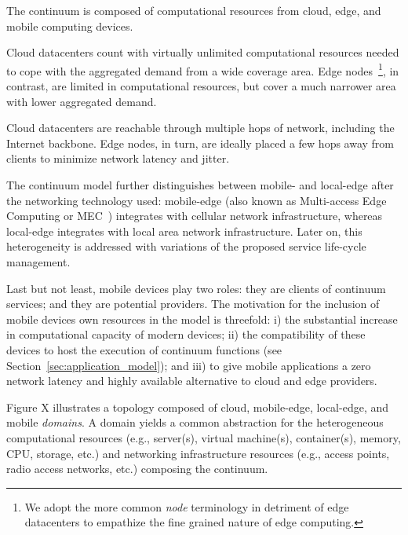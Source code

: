 The continuum is composed of computational resources from cloud, edge, and mobile computing devices. 

Cloud datacenters count with virtually unlimited computational resources needed to cope with the aggregated demand from a wide coverage area. Edge nodes~\footnote{We adopt the more common \textit{node} terminology in detriment of edge datacenters to empathize the fine grained nature of edge computing.}, in contrast, are limited in computational resources, but cover a much narrower area with lower aggregated demand. 

Cloud datacenters are reachable through multiple hops of network, including the Internet backbone. Edge nodes, in turn, are ideally placed a few hops away from clients to minimize network latency and jitter. 

The continuum model further distinguishes between mobile- and local-edge after the networking technology used: mobile-edge (also known as Multi-access Edge Computing or MEC~\cite{}) integrates with cellular network infrastructure, whereas local-edge integrates with local area network infrastructure. Later on, this heterogeneity is addressed with variations of the proposed service life-cycle management.

Last but not least, mobile devices play two roles: they are clients of continuum services; and they are potential providers. The motivation for the inclusion of mobile devices own resources in the model is threefold: i) the substantial increase in computational capacity of modern devices; ii) the compatibility of these devices to host the execution of continuum functions (see Section~\ref{sec:application_model}); and iii) to give mobile applications a zero network latency and highly available alternative to cloud and edge providers. 

Figure X illustrates a topology composed of cloud, mobile-edge, local-edge, and mobile \textit{domains}. A domain yields a common abstraction for the heterogeneous computational resources (e.g., server(s), virtual machine(s), container(s), memory, CPU, storage, etc.) and networking infrastructure resources (e.g., access points, radio access networks, etc.) composing the continuum.



